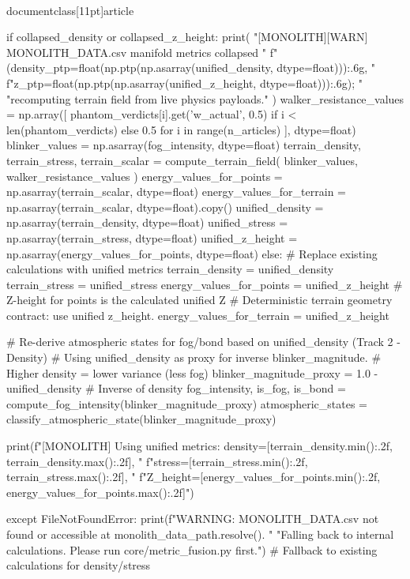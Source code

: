 \\documentclass[11pt]{article}
\begin{document}
\begin{CodeBlock}
{{{{{        if collapsed_density or collapsed_z_height:
            print(
                "[MONOLITH][WARN] MONOLITH_DATA.csv manifold metrics collapsed "
                f"(density_ptp={float(np.ptp(np.asarray(unified_density, dtype=float))):.6g}, "
                f"z_ptp={float(np.ptp(np.asarray(unified_z_height, dtype=float))):.6g}); "
                "recomputing terrain field from live physics payloads."
            )
            walker_resistance_values = np.array([
                phantom_verdicts[i].get('w_actual', 0.5) if i < len(phantom_verdicts) else 0.5
                for i in range(n_articles)
            ], dtype=float)
            blinker_values = np.asarray(fog_intensity, dtype=float)
            terrain_density, terrain_stress, terrain_scalar = compute_terrain_field(
                blinker_values, walker_resistance_values
            )
            energy_values_for_points = np.asarray(terrain_scalar, dtype=float)
            energy_values_for_terrain = np.asarray(terrain_scalar, dtype=float).copy()
            unified_density = np.asarray(terrain_density, dtype=float)
            unified_stress = np.asarray(terrain_stress, dtype=float)
            unified_z_height = np.asarray(energy_values_for_points, dtype=float)
        else:
            # Replace existing calculations with unified metrics
            terrain_density = unified_density
            terrain_stress = unified_stress
            energy_values_for_points = unified_z_height # Z-height for points is the calculated unified Z
            # Deterministic terrain geometry contract: use unified z_height.
            energy_values_for_terrain = unified_z_height

            # Re-derive atmospheric states for fog/bond based on unified_density (Track 2 - Density)
            # Using unified_density as proxy for inverse blinker_magnitude.
            # Higher density = lower variance (less fog)
            blinker_magnitude_proxy = 1.0 - unified_density # Inverse of density
            fog_intensity, is_fog, is_bond = compute_fog_intensity(blinker_magnitude_proxy)
            atmospheric_states = classify_atmospheric_state(blinker_magnitude_proxy)

        print(f"[MONOLITH] Using unified metrics: density=[{terrain_density.min():.2f}, {terrain_density.max():.2f}], "
              f"stress=[{terrain_stress.min():.2f}, {terrain_stress.max():.2f}], "
              f"Z_height=[{energy_values_for_points.min():.2f}, {energy_values_for_points.max():.2f}]")

    except FileNotFoundError:
        print(f"WARNING: MONOLITH_DATA.csv not found or accessible at {monolith_data_path.resolve()}. "
              "Falling back to internal calculations. Please run core/metric_fusion.py first.")
        # Fallback to existing calculations for density/stress
        
}}}}}
\end{CodeBlock}
\end{document}
